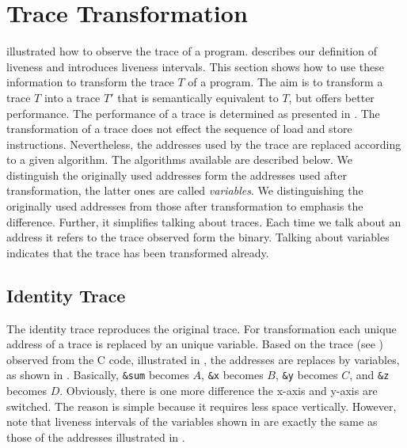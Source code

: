 \documentclass[onecolumn, openright, master, english, signatures]{dbrgrptt}
\begin{document}

\section{Trace Transformation}\label{sec:trace-transformation}

 illustrated how to observe the \ac{trace} of a program.
 describes our definition of liveness and introduces liveness intervals.
This section shows how to use these information to transform the \ac{trace} $T$ of a program.
The aim is to transform a \ac{trace} $T$ into a \ac{trace} $T'$ that is semantically equivalent to $T$, but offers better performance.
The performance of a \ac{trace} is determined as presented in .
The transformation of a \ac{trace} does not effect the sequence of load and store instructions.
Nevertheless, the addresses used by the \ac{trace} are replaced according to a given algorithm.
The algorithms available are described below.
We distinguish the originally used addresses form the addresses used after transformation, the latter ones are called \emph{variables}.
We distinguishing the originally used addresses from those after transformation to emphasis the difference.
Further, it simplifies talking about \ac{trace}s.
Each time we talk about an address it refers to the \ac{trace} observed form the binary.
Talking about variables indicates that the \ac{trace} has been transformed already.

\subsection{Identity Trace}

The identity trace reproduces the original \ac{trace}.
For transformation each unique address of a \ac{trace} is replaced by an unique variable.
Based on the \ac{trace} (see ) observed from the C code, illustrated in , the addresses are replaces by variables, as shown in .
Basically, \texttt{\&sum} becomes $A$, \texttt{\&x} becomes $B$, \texttt{\&y} becomes $C$, and \texttt{\&z} becomes $D$.
Obviously, there is one more difference the x-axis and y-axis are switched.
The reason is simple because it requires less space vertically.
However, note that liveness intervals of the variables shown in  are exactly the same as those of the addresses illustrated in .
\end{document}
